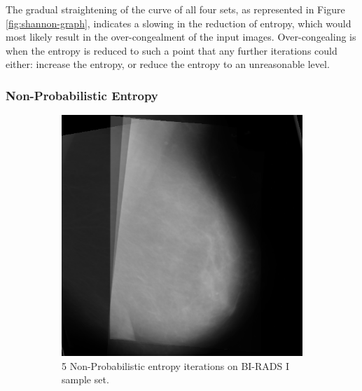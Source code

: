 The gradual straightening of the curve of all four sets, as represented in Figure \ref{fig:shannon-graph}, indicates a slowing in the reduction of entropy, which would most likely result in the over-congealment of the input images. Over-congealing is when the entropy is reduced to such a point that any further iterations could either: increase the entropy, or reduce the entropy to an unreasonable level.

\newpage
\subsubsection{Non-Probabilistic Entropy}

\begin{figure}[H]
    \centering
    \begin{subfigure}[t]{0.3\textwidth}
        \includegraphics[width=\textwidth]{Chapter3/nonProb-img/nonProb-5.png}
        \caption{5 Non-Probabilistic entropy iterations on BI-RADS I sample set.}
        \label{fig:5-nonProb}
    \end{subfigure} \hfill
    ~ %
    \begin{subfigure}[t]{0.3\textwidth}

\end{subfigure}
\end{figure}
